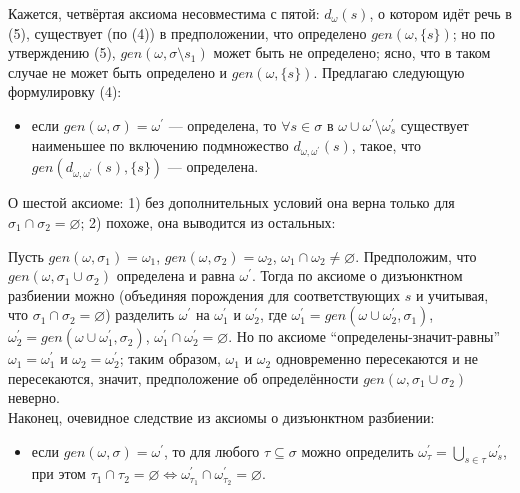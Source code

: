 





\hrulefill

Кажется, четвёртая аксиома несовместима с пятой: $d_\omega(s)$, о котором идёт речь в (5), существует (по (4)) в предположении, что определено $gen(\omega, \{s\})$; но по утверждению (5), $gen(\omega, \sigma\setminus s_1)$ может быть не определено; ясно, что в таком случае не может быть определено и $gen(\omega, \{s\})$. Предлагаю следующую формулировку (4):

\begin{itemize}
	\item если $gen(\omega,\sigma)=\omega^\prime$ --- определена, то $\forall s \in \sigma$ в $\omega \cup \omega^\prime \setminus \omega^\prime_s$ существует наименьшее по включению подмножество $d_{\omega,\omega^\prime}(s)$, такое, что $gen(d_{\omega,\omega^\prime}(s), \{s\})$ --- определена.
\end{itemize}

О шестой аксиоме: 1) без дополнительных условий она верна только для $\sigma_1\cap\sigma_2 = \varnothing$; 2) похоже, она выводится из остальных:

Пусть $gen(\omega,\sigma_1) = \omega_1$, $gen(\omega,\sigma_2) = \omega_2$, $\omega_1\cap\omega_2\ne\varnothing$. Предположим, что $gen(\omega,\sigma_1\cup\sigma_2)$ определена и равна $\omega^\prime$. Тогда по аксиоме о дизъюнктном разбиении можно (объединяя порождения для соответствующих $s$ и учитывая, что $\sigma_1\cap\sigma_2 = \varnothing$) разделить $\omega^\prime$ на $\omega^\prime_1$ и $\omega^\prime_2$, где $\omega^\prime_1 = gen(\omega\cup\omega^\prime_2,\sigma_1)$, $\omega^\prime_2 = gen(\omega\cup\omega^\prime_1,\sigma_2)$, $\omega^\prime_1 \cap \omega^\prime_2 = \varnothing$. Но по аксиоме ``определены-значит-равны'' $\omega_1 = \omega^\prime_1$ и $\omega_2 = \omega^\prime_2$; таким образом, $\omega_1$ и $\omega_2$ одновременно пересекаются и не пересекаются, значит, предположение об определённости $gen(\omega,\sigma_1\cup\sigma_2)$ неверно.
\\

Наконец, очевидное следствие из аксиомы о дизъюнктном разбиении:

\begin{itemize}
	\item если $gen(\omega,\sigma)=\omega^\prime$, то для любого $\tau \subseteq \sigma$ можно определить $\omega^\prime_\tau =\bigcup\limits_{s\in\tau}\omega^\prime_s$, при этом $\tau_1 \cap \tau_2 = \varnothing \Leftrightarrow \omega^\prime_{\tau_1} \cap \omega^\prime_{\tau_2} = \varnothing$.
\end{itemize}

